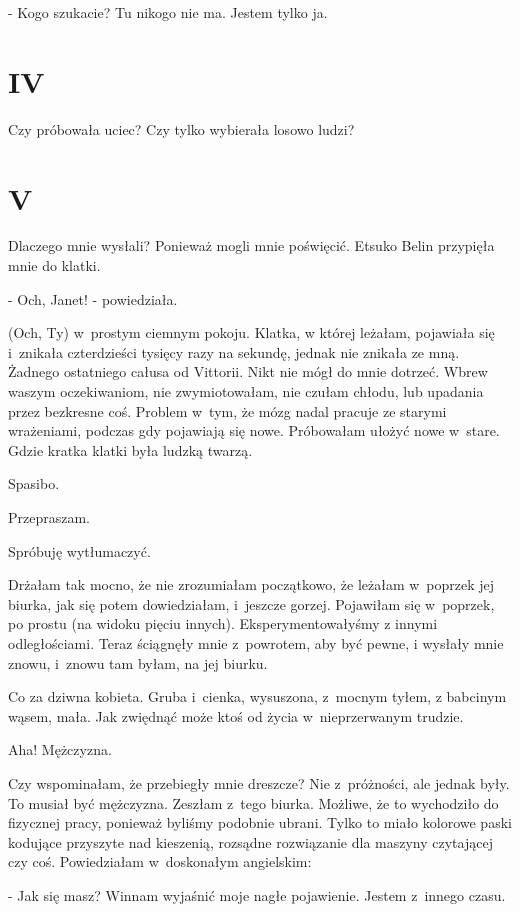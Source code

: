 \documentclass[oneside,polish,12pt,sfheadings]{mwbk}
\begin{document}
- Kogo szukacie? Tu nikogo
nie ma. Jestem tylko ja.

\chapter{IV}

Czy próbowała uciec? Czy tylko wybierała losowo ludzi?

\chapter{V}

Dlaczego mnie wysłali? Ponieważ mogli mnie poświęcić. Etsuko Belin
przypięła mnie do klatki.

- Och, Janet! - powiedziała. 

(Och, Ty) w~prostym ciemnym pokoju. Klatka,
w której leżałam, pojawiała się i~znikała czterdzieści tysięcy razy
na sekundę, jednak nie znikała ze mną. Żadnego ostatniego całusa od
Vittorii. Nikt nie mógł do mnie dotrzeć. Wbrew waszym oczekiwaniom,
nie zwymiotowałam, nie czułam chłodu, lub upadania przez bezkresne
coś. Problem w~tym, że mózg nadal pracuje ze starymi wrażeniami, podczas
gdy pojawiają się nowe. Próbowałam ułożyć nowe w~stare. Gdzie kratka
klatki była ludzką twarzą.

Spasibo.

Przepraszam.

Spróbuję wytłumaczyć.

Drżałam tak mocno, że nie zrozumiałam początkowo, że leżałam w~poprzek
jej biurka, jak się potem dowiedziałam, i~jeszcze gorzej. Pojawiłam
się w~poprzek, po prostu (na widoku pięciu innych). Eksperymentowałyśmy
z innymi odległościami. Teraz ściągnęły mnie z~powrotem, aby być pewne,
i wysłały mnie znowu, i~znowu tam byłam, na jej biurku.

Co za dziwna kobieta. Gruba i~cienka, wysuszona, z~mocnym tyłem, z
babcinym wąsem, mała. Jak zwiędnąć może ktoś od życia w~nieprzerwanym
trudzie.

Aha! Mężczyzna.

Czy wspominałam, że przebiegły mnie dreszcze? Nie z~próżności, ale
jednak były. To musiał być mężczyzna. Zeszłam z~tego biurka. Możliwe,
że to wychodziło do fizycznej pracy, ponieważ byliśmy podobnie ubrani.
Tylko to miało kolorowe paski kodujące przyszyte nad kieszenią, rozsądne
rozwiązanie dla maszyny czytającej czy coś. Powiedziałam w~doskonałym
angielskim: 

- Jak się masz? Winnam wyjaśnić moje nagłe pojawienie.
Jestem z~innego czasu.
\end{document}
